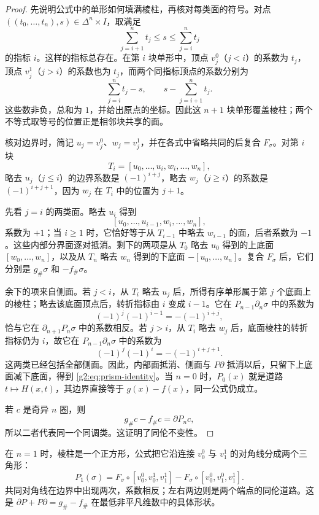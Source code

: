 \begin{proof}
	先说明公式中的单形如何填满棱柱，再核对每类面的符号。对点 \(((t_0,\ldots,t_n),s)\in\Delta^n\times I\)，取满足
	\[
		\sum_{j=i+1}^nt_j\le s\le\sum_{j=i}^nt_j
	\]
	的指标 \(i\)。这样的指标总存在。在第 \(i\) 块单形中，顶点 \(v_j^0\)（\(j<i\)）的系数为 \(t_j\)，顶点 \(v_j^1\)（\(j>i\)）的系数也为 \(t_j\)，而两个同指标顶点的系数分别为
	\[
		\sum_{j=i}^nt_j-s,\qquad
		s-\sum_{j=i+1}^nt_j.
	\]
	这些数非负，总和为 \(1\)，并给出原点的坐标。因此这 \(n+1\) 块单形覆盖棱柱；两个不等式取等号的位置正是相邻块共享的面。

	核对边界时，简记 \(u_j=v_j^0\)、\(w_j=v_j^1\)，并在各式中省略共同的后复合 \(F_\sigma\)。对第 \(i\) 块
	\[
		T_i=[u_0,\ldots,u_i,w_i,\ldots,w_n],
	\]
	略去 \(u_j\)（\(j\le i\)）的边界系数是 \((-1)^{i+j}\)，略去 \(w_j\)（\(j\ge i\)）的系数是 \((-1)^{i+j+1}\)，因为 \(w_j\) 在 \(T_i\) 中的位置为 \(j+1\)。

	先看 \(j=i\) 的两类面。略去 \(u_i\) 得到
	\[
		[u_0,\ldots,u_{i-1},w_i,\ldots,w_n],
	\]
	系数为 \(+1\)；当 \(i\ge1\) 时，它恰好等于从 \(T_{i-1}\) 中略去 \(w_{i-1}\) 的面，后者系数为 \(-1\)。这些内部分界面逐对抵消。剩下的两项是从 \(T_0\) 略去 \(u_0\) 得到的上底面 \([w_0,\ldots,w_n]\)，以及从 \(T_n\) 略去 \(w_n\) 得到的下底面 \(-[u_0,\ldots,u_n]\)。复合 \(F_\sigma\) 后，它们分别是 \(g_\#\sigma\) 和 \(-f_\#\sigma\)。

	余下的项来自侧面。若 \(j<i\)，从 \(T_i\) 略去 \(u_j\) 后，所得有序单形属于第 \(j\) 个底面上的棱柱；略去该底面顶点后，转折指标由 \(i\) 变成 \(i-1\)。它在 \(P_{n-1}\partial_n\sigma\) 中的系数为
	\[
		(-1)^j(-1)^{i-1}=-(-1)^{i+j},
	\]
	恰与它在 \(\partial_{n+1}P_n\sigma\) 中的系数相反。若 \(j>i\)，从 \(T_i\) 略去 \(w_j\) 后，底面棱柱的转折指标仍为 \(i\)，故它在 \(P_{n-1}\partial_n\sigma\) 中的系数为
	\[
		(-1)^j(-1)^i=-(-1)^{i+j+1}.
	\]
	这两类已经包括全部侧面。因此，内部面抵消、侧面与 \(P\partial\) 抵消以后，只留下上底面减下底面，得到 \eqref{g2:eq:prism-identity}。当 \(n=0\) 时，\(P_0(x)\) 就是道路 \(t\mapsto H(x,t)\)，其边界直接等于 \(g(x)-f(x)\)，同一公式仍成立。

	若 \(c\) 是奇异 \(n\) 圈，则
	\[
		g_\#c-f_\#c=\partial P_nc,
	\]
	所以二者代表同一个同调类。这证明了同伦不变性。
\end{proof}

在 \(n=1\) 时，棱柱是一个正方形，公式把它沿连接 \(v_0^0\) 与 \(v_1^1\) 的对角线分成两个三角形：
\[
	P_1(\sigma)=F_\sigma\circ[v_0^0,v_0^1,v_1^1]
	-F_\sigma\circ[v_0^0,v_1^0,v_1^1].
\]
共同对角线在边界中出现两次，系数相反；左右两边则是两个端点的同伦道路。这是 \(\partial P+P\partial=g_\#-f_\#\) 在最低非平凡维数中的具体形状。

